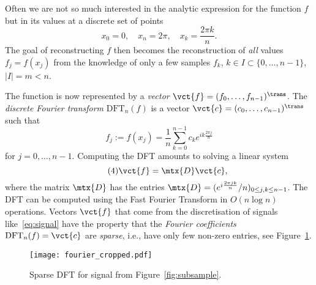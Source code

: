 \documentclass{article}
\begin{document}
Often we are not so much interested in the analytic expression for the function $f$ but in its values at a discrete set of points
\begin{equation*}
 x_0=0, \quad x_n=2\pi, \quad x_k=\frac{2\pi k}{n}.
\end{equation*}
The goal of reconstructing $f$ then becomes the reconstruction of {\em all} values $f_j=f(x_j)$ from the knowledge of only a few samples $f_k$, $k\in I\subset \{0,\dots,n-1\}$, $|I|=m<n$. 

The function is now represented by a {\em vector} $\vct{f}=(f_0,\dots,f_{n-1})^{\trans}$. The {\em discrete Fourier transform} $\mathrm{DFT}_n(f)$ is a vector $\vct{c}=(c_0,\dots,c_{n-1})^{\trans}$ such that
\begin{equation}\label{eq:discrete-fourier-sum}\tag{3}
 f_j := f(x_j) = \frac{1}{n}\sum_{k=0}^{n-1} c_k e^{ik\frac{2\pi j}{n}}
\end{equation}
for $j=0,\dots,n-1$.
Computing the DFT amounts to solving a linear system
\begin{equation}\label{eq:dft}\tag{4}
 \vct{f} = \mtx{D} \vct{c},
\end{equation}
where the matrix $\mtx{D}$ has the entries $\mtx{D} = (e^{i\frac{2\pi jk}{n}}/n)_{0\leq j,k\leq n-1}$.
The DFT can be computed using the Fast Fourier Transform in $O(n\log n)$ operations. 
Vectors $\vct{f}$ that come from the discretisation of signals like~\eqref{eq:signal} have the property that the {\em Fourier coefficients} $\mathrm{DFT}_n(f)=\vct{c}$ are {\em sparse}, i.e., have only few non-zero entries, see Figure~\ref{fig:fourierex}.

\begin{figure}[h!]
 \centering
 \texttt{[image: fourier\_cropped.pdf]}
 \caption{Sparse DFT for signal from Figure~\ref{fig:subsample}.}\label{fig:fourierex}
\end{figure}
\end{document}
